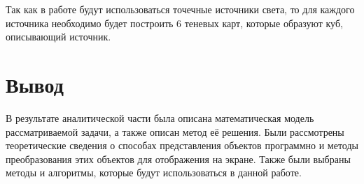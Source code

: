 Так как в работе будут использоваться точечные источники света, то для каждого источника необходимо будет построить 6 теневых карт, которые образуют куб, описывающий источник.

\section*{Вывод}

В результате аналитической части была описана математическая модель рассматриваемой задачи, а также описан метод её решения. Были рассмотрены теоретические сведения о способах представления объектов программно и методы преобразования этих объектов для отображения на экране. Также были выбраны методы и алгоритмы, которые будут использоваться в данной работе.

\clearpage
